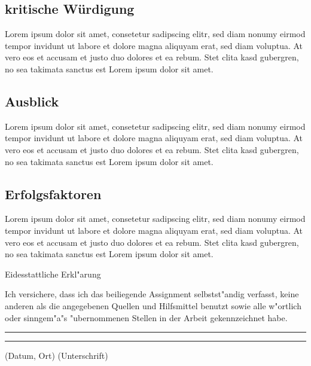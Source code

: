 \documentclass[a4paper,12pt]{article}
\begin{document}
\subsection{kritische Würdigung}
Lorem ipsum dolor sit amet, consetetur sadipscing elitr, sed diam nonumy eirmod tempor invidunt ut labore et dolore magna aliquyam erat, sed diam voluptua. At vero eos et accusam et justo duo dolores et ea rebum. Stet clita kasd gubergren, no sea takimata sanctus est Lorem ipsum dolor sit amet.

\subsection{Ausblick}
Lorem ipsum dolor sit amet, consetetur sadipscing elitr, sed diam nonumy eirmod tempor invidunt ut labore et dolore magna aliquyam erat, sed diam voluptua. At vero eos et accusam et justo duo dolores et ea rebum. Stet clita kasd gubergren, no sea takimata sanctus est Lorem ipsum dolor sit amet.

\subsection{Erfolgsfaktoren}
Lorem ipsum dolor sit amet, consetetur sadipscing elitr, sed diam nonumy eirmod tempor invidunt ut labore et dolore magna aliquyam erat, sed diam voluptua. At vero eos et accusam et justo duo dolores et ea rebum. Stet clita kasd gubergren, no sea takimata sanctus est Lorem ipsum dolor sit amet.


%



\pagestyle{empty} 

\onehalfspacing

\thispagestyle{empty}
\clearpage
\begin{center}
{\Large Eidesstattliche Erkl"arung}
\vspace*{4cm}\end{center}
\noindent
Ich versichere, dass ich das beiliegende Assignment selbstst"andig verfasst, keine anderen als die angegebenen Quellen und Hilfsmittel benutzt sowie alle w"ortlich oder sinngem"a"s "ubernommenen Stellen in der Arbeit gekennzeichnet habe. 
\vspace{3cm}

\hspace{-0.8cm}
\rule[0.5ex]{6.5cm}{1pt}
\hspace{1.3cm}
\rule[0.5ex]{6.5cm}{1pt}
(Datum, Ort)
\hspace{6.3cm}(Unterschrift)
\end{document}
